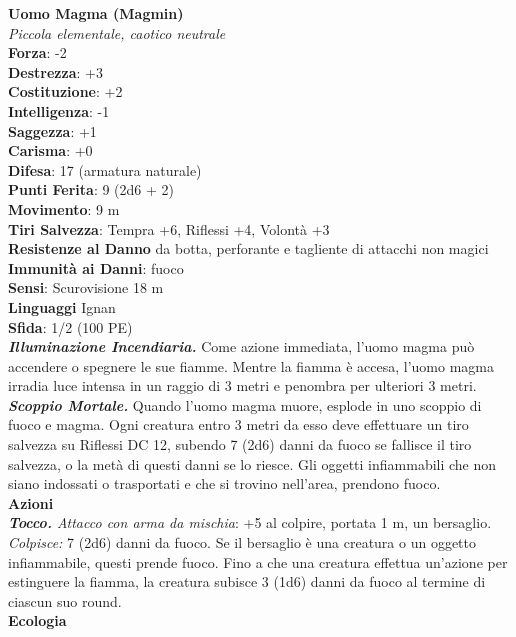 \begin{multicols}{2}
\medskip\textbf{Uomo Magma (Magmin)}\\
\emph{Piccola elementale, caotico neutrale}\\
\textbf{Forza}: -2\\
\textbf{Destrezza}: +3\\
\textbf{Costituzione}: +2\\
\textbf{Intelligenza}: -1\\
\textbf{Saggezza}: +1\\
\textbf{Carisma}: +0\\
\textbf{Difesa}: 17 (armatura naturale)\\
\textbf{Punti Ferita}: 9 (2d6 + 2)\\
\textbf{Movimento}: 9 m\\
\textbf{Tiri Salvezza}: Tempra +6, Riflessi +4, Volontà +3\\
\textbf{Resistenze al Danno} da botta, perforante e tagliente di attacchi non magici\\
\textbf{Immunità ai Danni}: fuoco\\
\textbf{Sensi}: Scurovisione 18 m\\
\textbf{Linguaggi} Ignan\\
\textbf{Sfida}: 1/2 (100 PE)\smallskip\\
\emph{\textbf{Illuminazione Incendiaria.}} Come azione immediata, l'uomo magma può accendere o spegnere le sue fiamme. Mentre la fiamma è accesa, l'uomo magma irradia luce intensa in un raggio di 3 metri e penombra per ulteriori 3 metri.\\
\emph{\textbf{Scoppio Mortale.}} Quando l'uomo magma muore, esplode in uno scoppio di fuoco e magma. Ogni creatura entro 3 metri da esso deve effettuare un tiro salvezza su Riflessi DC  12, subendo 7 (2d6) danni da fuoco se fallisce il tiro salvezza, o la metà di questi danni se lo riesce. Gli oggetti infiammabili che non siano indossati o trasportati e che si trovino nell'area, prendono fuoco.\\
\smallskip\textbf{Azioni}\\
\emph{\textbf{Tocco.} Attacco con arma da mischia}: +5 al colpire, portata 1 m, un bersaglio.\\
\emph{Colpisce:} 7 (2d6) danni da fuoco. Se il bersaglio è una creatura o un oggetto infiammabile, questi prende fuoco. Fino a che una creatura effettua un'azione per estinguere la fiamma, la creatura subisce 3 (1d6) danni da fuoco al termine di ciascun suo round.\\
\textbf{Ecologia}\\

\end{multicols}
